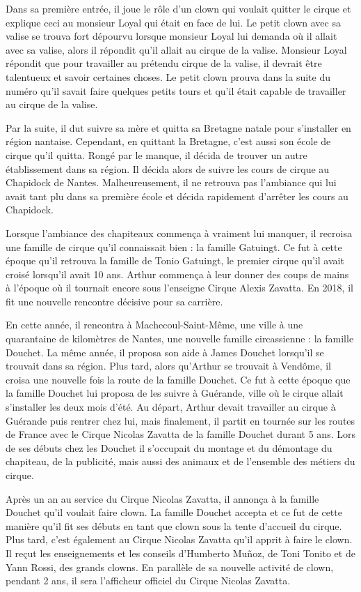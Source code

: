 Dans sa première entrée, il joue le rôle d’un clown qui voulait quitter le cirque et explique ceci au monsieur Loyal qui était en face de lui. Le petit clown avec sa valise se trouva fort dépourvu lorsque monsieur Loyal lui demanda où il allait avec sa valise, alors il répondit qu’il allait au cirque de la valise. Monsieur Loyal répondit que pour travailler au prétendu cirque de la valise, il devrait être talentueux et savoir certaines choses. Le petit clown prouva dans la suite du numéro qu’il savait faire quelques petits tours et qu’il était capable de travailler au cirque de la valise. 

Par la suite, il dut suivre sa mère et quitta sa Bretagne natale pour s’installer en région nantaise. Cependant, en quittant la Bretagne, c'est aussi son école de cirque qu’il quitta. Rongé par le manque, il décida de trouver un autre établissement dans sa région. Il décida alors de suivre les cours de cirque au Chapidock de Nantes. Malheureusement, il ne retrouva pas l'ambiance qui lui avait tant plu dans sa première école et décida rapidement d'arrêter les cours au Chapidock. 

Lorsque l’ambiance des chapiteaux commença à vraiment lui manquer, il recroisa une famille de cirque qu’il connaissait bien : la famille Gatuingt. Ce fut à cette époque qu'il retrouva la famille de Tonio Gatuingt, le premier cirque qu’il avait croisé lorsqu’il avait 10 ans. Arthur commença à leur donner des coups de mains à l’époque où il tournait encore sous l’enseigne Cirque Alexis Zavatta. En 2018, il fit une nouvelle rencontre décisive pour sa carrière. 

En cette année, il rencontra à Machecoul-Saint-Même, une ville à une quarantaine de kilomètres de Nantes, une nouvelle famille circassienne : la famille Douchet. La même année, il proposa son aide à James Douchet lorsqu’il se trouvait dans sa région. Plus tard, alors qu’Arthur se trouvait à Vendôme, il croisa une nouvelle fois la route de la famille Douchet. Ce fut à cette époque que la famille Douchet lui proposa de les suivre à Guérande, ville où le cirque allait s’installer les deux mois d’été. Au départ, Arthur devait travailler au cirque à Guérande puis rentrer chez lui, mais finalement, il partit en tournée sur les routes de France avec le Cirque Nicolas Zavatta de la famille Douchet durant 5 ans. Lors de ses débuts chez les Douchet il s’occupait du montage et du démontage du chapiteau, de la publicité, mais aussi des animaux et de l’ensemble des métiers du cirque. 

Après un an au service du Cirque Nicolas Zavatta, il annonça à la famille Douchet qu'il voulait faire clown. La famille Douchet accepta et ce fut de cette manière qu’il fit ses débuts en tant que clown sous la tente d’accueil du cirque. Plus tard, c'est également au Cirque Nicolas Zavatta qu’il apprit à faire le clown. Il reçut les enseignements et les conseils d’Humberto Muñoz, de Toni Tonito et de Yann Rossi, des grands clowns. En parallèle de sa nouvelle activité de clown, pendant 2 ans, il sera l’afficheur officiel du Cirque Nicolas Zavatta. 

